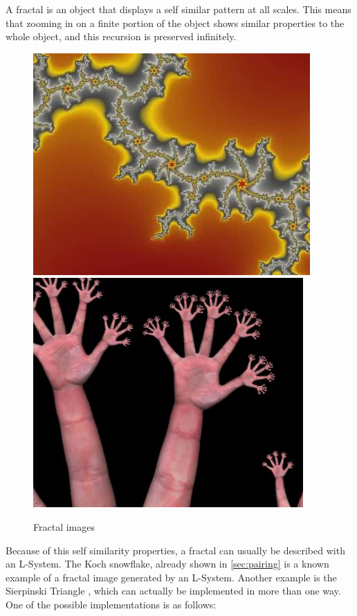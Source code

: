 \documentclass{acmtog}
\begin{document}
A fractal is an object that displays a self similar pattern at all scales. This means that zooming in on a finite portion of the object shows similar properties to the whole object, and this recursion is preserved infinitely.

\begin{figure}[!htp]
  \begin{center}
    \includegraphics[width=0.8\columnwidth]{images/5_1_fractal}
    \includegraphics[width=0.8\columnwidth]{images/5_2_fractal}
    \caption{Fractal images \label{fig:fractais}}
    \end{center}
\end{figure}

Because of this self similarity properties, a fractal can usually be described with an L-System. The Koch snowflake, already shown in \autoref{sec:pairing} is a known example of a fractal image generated by an L-System. Another example is the Sierpinski Triangle \cite{FRACTALS}, which can actually be implemented in more than one way. One of the possible implementations is as follows:
\end{document}
